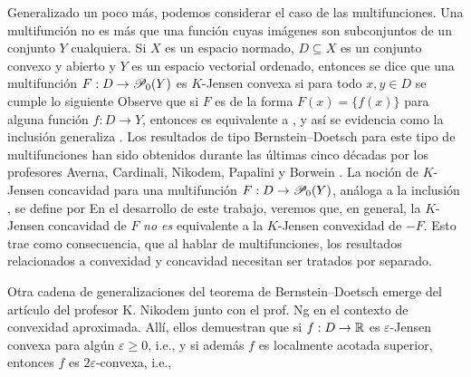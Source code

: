 Generalizado un poco más, podemos considerar el caso de las multifunciones.
Una multifunci\'on no es m\'as que una funci\'on cuyas im\'agenes
son subconjuntos de un conjunto $Y$ cualquiera.
Si $X$ es un espacio normado, $D\subseteq X$ es un conjunto convexo y abierto y
$Y$ es un espacio vectorial ordenado,
entonces se dice que una multifunción $F:D\to \P_0(Y)$ es $K$-Jensen convexa si para todo 
$x,y\in D$ se cumple lo siguiente
Observe que si $F$ es de la forma $F(x)=\{f(x)\}$ para alguna función $f:D\to Y$, entonces 
es equivalente a , y así se evidencia como la inclusión  generaliza .
Los resultados de tipo Bernstein--Doetsch  para este tipo de multifunciones han sido obtenidos 
durante las últimas cinco décadas por los profesores 
Averna, Cardinali, Nikodem, Papalini \cite{AveCar90,CarNikPap93,Nik86,Nik87a,Nik87c,Nik89,Pap90} 
y Borwein \cite{Bor77}. La noción de $K$-Jensen concavidad para una multifunción 
$F:D\to \P_0(Y)$, análoga a la inclusión , se define por 
En el desarrollo de este trabajo, veremos que, en general, la $K$-Jensen concavidad 
de $F$ \textit{no es} equivalente a la $K$-Jensen 
convexidad de $-F$. Esto trae como consecuencia, que al hablar de multifunciones, 
los resultados relacionados a convexidad y concavidad necesitan ser tratados por separado. 

Otra cadena de generalizaciones del teorema de Bernstein--Doetsch emerge del artículo del profesor
K. Nikodem junto con el prof. Ng \cite{NgNik93} en el contexto de convexidad aproximada.
Allí, ellos demuestran que si $f:D\to\R$ es $\varepsilon$-Jensen convexa para algún 
$\varepsilon\geq0$, i.e.,
y si además $f$ es localmente acotada superior, entonces $f$ es $2\varepsilon$-convexa, i.e.,

